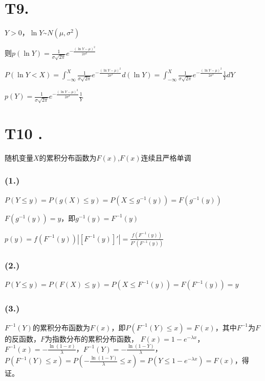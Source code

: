 \documentclass{article}
\newcommand\f[2]{\frac{#1}{#2}}
\begin{document}
\section*{T9. }

$Y>0$，$\ln Y$\~{}$N(\mu, \sigma^2)$

则$p(\ln Y)=\f{1}{\sigma\sqrt{2\pi}}e^{-\f{(\ln Y-\mu)^2}{2\sigma^2}}$

$P(\ln Y<X)=\int_{-\infty}^{X}\f{1}{\sigma\sqrt{2\pi}}e^{-\f{(\ln Y-\mu)^2}{2\sigma^2}}d(\ln Y)=\int_{-\infty}^{X}\f{1}{\sigma\sqrt{2\pi}}e^{-\f{(\ln Y-\mu)^2}{2\sigma^2}}\f{1}{Y}dY$

$p(Y)=\f{1}{\sigma\sqrt{2\pi}}e^{-\f{(\ln Y-\mu)^2}{2\sigma^2}}\f{1}{Y}$

\section*{T10 .}

随机变量$X$的累积分布函数为$F(x)$,$F(x)$连续且严格单调

\subsubsection*{(1.)}


$P(Y\leq y)=P(g(X)\leq y)=P(X\leq g^{-1}(y))=F(g^{-1}(y))$

$F(g^{-1}(y))=y$，即$g^{-1}(y)=F^{-1}(y)$

$p(y)=f(F^{-1}(y))|[F^{-1}(y)]'|=\f{f(F^{-1}(y))}{F'(F^{-1}(y))}$

\subsubsection*{(2.)}

$P(Y\leq y)=P(F(X)\leq y)=P(X\leq F^{-1}(y))=F(F^{-1}(y))=y$

\subsubsection*{(3.)}


$F^{-1}(Y)$的累积分布函数为$F(x)$，即$P(F^{-1}(Y)\leq x)=F(x)$，其中$F^{-1}$为$F$的反函数，$F$为指数分布的累积分布函数，
$F(x)=1-e^{-\lambda x}$，$F^{-1}(x)=-\f{\ln(1-x)}{\lambda}$，$F^{-1}(Y)=-\f{\ln(1-Y)}{\lambda}$，$P(F^{-1}(Y)\leq x)=
P(-\f{\ln(1-Y)}{\lambda}\leq x)=P(Y\leq 1-e^{-\lambda x})=F(x)$，得证。
\end{document}
